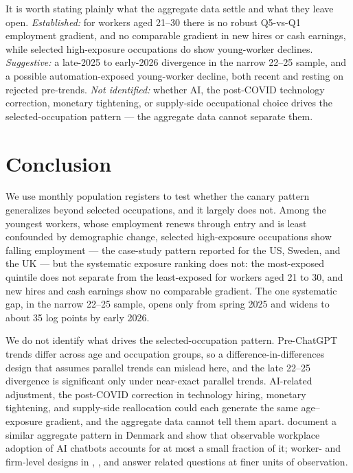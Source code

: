 \documentclass[12pt]{article}
\begin{document}
It is worth stating plainly what the aggregate data settle and what they leave open. \emph{Established:} for workers aged 21--30 there is no robust Q5-vs-Q1 employment gradient, and no comparable gradient in new hires or cash earnings, while selected high-exposure occupations do show young-worker declines. \emph{Suggestive:} a late-2025 to early-2026 divergence in the narrow 22--25 sample, and a possible automation-exposed young-worker decline, both recent and resting on rejected pre-trends. \emph{Not identified:} whether AI, the post-COVID technology correction, monetary tightening, or supply-side occupational choice drives the selected-occupation pattern --- the aggregate data cannot separate them.


\section{Conclusion}
\label{sec:conclusion}

We use monthly population registers to test whether the canary pattern generalizes beyond selected occupations, and it largely does not. Among the youngest workers, whose employment renews through entry and is least confounded by demographic change, selected high-exposure occupations show falling employment --- the case-study pattern reported for the US, Sweden, and the UK --- but the systematic exposure ranking does not: the most-exposed quintile does not separate from the least-exposed for workers aged 21 to 30, and new hires and cash earnings show no comparable gradient. The one systematic gap, in the narrow 22--25 sample, opens only from spring 2025 and widens to about 35 log points by early 2026.

We do not identify what drives the selected-occupation pattern. Pre-ChatGPT trends differ across age and occupation groups, so a difference-in-differences design that assumes parallel trends can mislead here, and the late 22--25 divergence is significant only under near-exact parallel trends. AI-related adjustment, the post-COVID correction in technology hiring, monetary tightening, and supply-side reallocation could each generate the same age--exposure gradient, and the aggregate data cannot tell them apart. \citet{humlum2026} document a similar aggregate pattern in Denmark and show that observable workplace adoption of AI chatbots accounts for at most a small fraction of it; worker- and firm-level designs in \citet{brynjolfsson2025}, \citet{lodefalk2026}, and \citet{humlum2026} answer related questions at finer units of observation.
\end{document}
